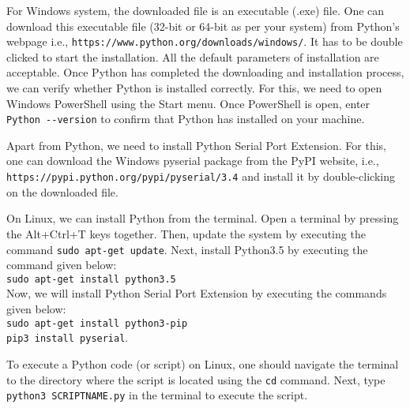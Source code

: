 For Windows system, the downloaded file is an executable (.exe) file. One can download 
this executable file (32-bit or 64-bit as per your system) from Python's webpage i.e.,
{\tt https://www.python.org/downloads/windows/}. 
It has to be double clicked to start the installation. All the default parameters of installation
are acceptable. Once Python has completed the downloading and installation process, we can verify whether
Python is installed correctly. For this, we need to open Windows PowerShell using the Start menu. 
Once PowerShell is open, enter {\tt Python -{}-version} to confirm that Python has installed on your machine. 

Apart from Python, we need to install Python Serial Port Extension. 
For this, one can download the
Windows pyserial package from the PyPI website, i.e., {\tt https://pypi.python.org/pypi/pyserial/3.4} and 
install it by double-clicking on the downloaded file. 

On Linux, we can install Python from the terminal. Open a terminal by 
pressing the Alt+Ctrl+T keys together. Then, update the system by executing the 
command {\tt sudo apt-get update}. Next, install Python3.5 by executing the command given below:\\
{\tt sudo apt-get install python3.5}\\
Now, we will install Python Serial Port Extension by executing the commands given below:\\ 
{\tt sudo apt-get install python3-pip \\
pip3 install pyserial}. 

To execute a Python code (or script) on Linux, one should 
navigate the terminal to the directory where the script is located using the {\tt cd} command.
Next, type {\tt python3 SCRIPTNAME.py} in the terminal to execute the script. 

            
            
